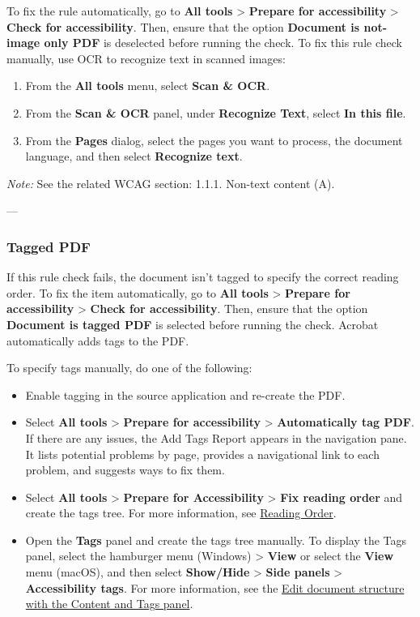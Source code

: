 To fix the rule automatically, go to \textbf{All tools} > \textbf{Prepare for accessibility} > \textbf{Check for accessibility}. Then, ensure that the option \textbf{Document is not-image only PDF} is deselected before running the check.
To fix this rule check manually, use OCR to recognize text in scanned images:
\begin{enumerate}
    \item From the \textbf{All tools} menu, select \textbf{Scan \& OCR}.
    \item From the \textbf{Scan \& OCR} panel, under \textbf{Recognize Text}, select \textbf{In this file}.
    \item From the \textbf{Pages} dialog, select the pages you want to process, the document language, and then select \textbf{Recognize text}.
\end{enumerate}

\vspace{0.5em}
\noindent\textit{Note:} See the related WCAG section: 1.1.1. Non-text content (A)\footnotemark[1].

---

\subsubsection*{Tagged PDF}
If this rule check fails, the document isn't tagged to specify the correct reading order\footnotemark[1].
To fix the item automatically, go to \textbf{All tools} > \textbf{Prepare for accessibility} > \textbf{Check for accessibility}. Then, ensure that the option \textbf{Document is tagged PDF} is selected before running the check. Acrobat automatically adds tags to the PDF.

To specify tags manually, do one of the following:
\begin{itemize}
    \item Enable tagging in the source application and re-create the PDF.
    \item Select \textbf{All tools} > \textbf{Prepare for accessibility} > \textbf{Automatically tag PDF}. If there are any issues, the Add Tags Report appears in the navigation pane. It lists potential problems by page, provides a navigational link to each problem, and suggests ways to fix them.
    \item Select \textbf{All tools} > \textbf{Prepare for Accessibility} > \textbf{Fix reading order} and create the tags tree. For more information, see \hyperref[sec:reading-order]{Reading Order}.
    \item Open the \textbf{Tags} panel and create the tags tree manually. To display the Tags panel, select the hamburger menu (Windows) > \textbf{View} or select the \textbf{View} menu (macOS), and then select \textbf{Show/Hide} > \textbf{Side panels} > \textbf{Accessibility tags}. For more information, see the \hyperref[sec:edit-structure]{Edit document structure with the Content and Tags panel}.
\end{itemize}

